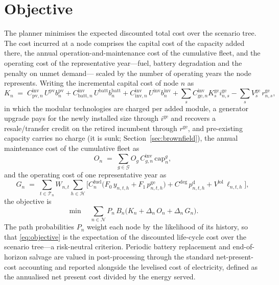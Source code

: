 \documentclass[11pt,a4paper]{article}
\theoremstyle{plain}
\theoremstyle{definition}
\begin{document}
\section{Objective}
\label{sec:objective}

The planner minimises the expected discounted total cost over the scenario tree. The
cost incurred at a node comprises the capital cost of the capacity added there, the
annual operation-and-maintenance cost of the cumulative fleet, and the operating cost of
the representative year---fuel, battery degradation and the penalty on unmet demand---
scaled by the number of operating years the node represents. Writing the incremental
capital cost of node $n$ as
\begin{equation}
  K_n \;=\;
  C^{\mathrm{inv}}_{\mathrm{pv},n}\,U^{\mathrm{pv}} b^{\mathrm{pv}}_n
  + C^{\mathrm{inv}}_{\mathrm{batt},n}\,U^{\mathrm{batt}} b^{\mathrm{batt}}_n
  + C^{\mathrm{inv}}_{\mathrm{inv},n}\,U^{\mathrm{inv}} b^{\mathrm{inv}}_n
  + \sum_{s} C^{\mathrm{inv}}_{\mathrm{ge},n}K^{\mathrm{ge}}_s i^{\mathrm{ge}}_{n,s}
  - \sum_{s} V^{\mathrm{ge}}_s\, r^{\mathrm{ge}}_{n,s},
\end{equation}
in which the modular technologies are charged per added module, a generator upgrade pays
for the newly installed size through $i^{\mathrm{ge}}$ and recovers a resale/transfer
credit on the retired incumbent through $r^{\mathrm{ge}}$, and pre-existing capacity
carries no charge (it is sunk; Section~\ref{sec:brownfield}),
the annual maintenance cost of the cumulative fleet as
\begin{equation}
  O_n \;=\; \sum_{g\in\mathcal{G}} O_g\, C^{\mathrm{inv}}_{g,n}\,\mathrm{cap}^{g}_n,
\end{equation}
and the operating cost of one representative year as
\begin{equation}
  G_n \;=\; \sum_{t\in\mathcal{T}_n} W_{n,t} \sum_{h\in\mathcal{H}}
  \Big[
    C^{\mathrm{fuel}}_n\big(F_0\,y_{n,t,h} + F_1\,p^{\mathrm{ge}}_{n,t,h}\big)
    + C^{\mathrm{deg}}\,p^{\mathrm{d}}_{n,t,h}
    + V^{\mathrm{lol}}\,\ell_{n,t,h}
  \Big],
\end{equation}
the objective is
\begin{equation}
  \min \quad
  \sum_{n\in\mathcal{N}} P_n\,B_n
  \big( K_n + \Delta_n\,O_n + \Delta_n\,G_n \big).
  \label{eq:objective}
\end{equation}
The path probabilities $P_n$ weight each node by the likelihood of its history, so that
\eqref{eq:objective} is the expectation of the discounted life-cycle cost over the
scenario tree---a risk-neutral criterion. Periodic battery replacement and end-of-horizon
salvage are valued in post-processing through the standard net-present-cost accounting and
reported alongside the levelised cost of electricity, defined as the annualised net
present cost divided by the energy served.
\end{document}
